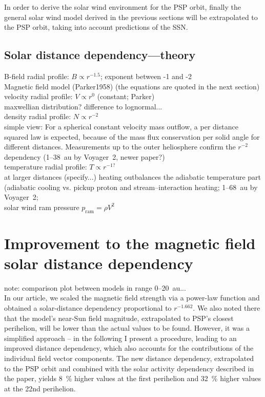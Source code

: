 In order to derive the solar wind environment for the PSP orbit, finally the general solar wind model derived in the previous sections will be extrapolated to the PSP orbit, taking into account predictions of the SSN.\\


\subsection{Solar distance dependency---theory}
B-field radial profile: $B \propto r^{-1.5}$; exponent between -1 and -2\\
	Magnetic field model (Parker1958) (the equations are quoted in the next section)\\
velocity radial profile: $V \propto r^{0}$ (constant; Parker)\\
	maxwellian distribution? difference to lognormal...\\
density radial profile: $N \propto r^{-2}$\\
	simple view: For a spherical constant velocity mass outflow, a per distance squared law is expected, because of the mass flux conservation per solid angle for different distances. Measurements up to the outer heliosphere confirm the $r^{-2}$ dependency (1--38~au by Voyager~2, \citep{Belcher1993} newer paper?)\\

temperature radial profile: $T \propto r^{-1?}$\\
	at larger distances (specify...) heating outbalances the adiabatic temperature part (adiabatic cooling vs. pickup proton and stream--interaction heating; 1--68~au by Voyager~2; \citet{Richardson2003}\\
solar wind ram pressure $p_\text{ram} = \rho V^2$\\


\section{Improvement to the magnetic field solar distance dependency}

note: comparison plot between models in range 0--20~au...\\

In our article, we scaled the magnetic field strength via a power-law function and obtained a solar-distance dependency proportional to $r^{-1.662}$. We also noted there that the model's near-Sun field magnitude, extrapolated to PSP's closest perihelion, will be lower than the actual values to be found. However, it was a simplified approach -- in the following I present a procedure, leading to an improved distance dependency, which also accounts for the contributions of the individual field vector components. The new distance dependency, extrapolated to the PSP orbit and combined with the solar activity dependency described in the paper, yields \SI{8}{\%} higher values at the first perihelion and \SI{32}{\%} higher values at the 22nd perihelion.\\

